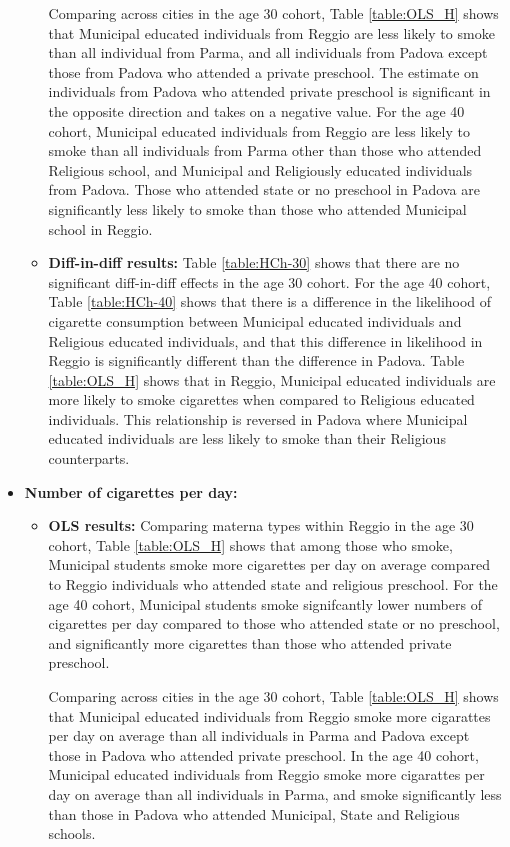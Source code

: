 \documentclass[11pt]{article}
\begin{document}
\begin{itemize}
\begin{itemize}
	Comparing across cities in the age 30 cohort, Table \ref{table:OLS_H} shows that Municipal educated individuals from Reggio are less likely to smoke than all individual from Parma, and all individuals from Padova except those from Padova who attended a private preschool. The estimate on individuals from Padova who attended private preschool is significant in the opposite direction and takes on a negative value. For the age 40 cohort, Municipal educated individuals from Reggio are less likely to smoke than all individuals from Parma other than those who attended Religious school, and Municipal and Religiously educated individuals from Padova. Those who attended state or no preschool in Padova are significantly less likely to smoke than those who attended Municipal school in Reggio.

	\item \textbf{Diff-in-diff results:} Table \ref{table:HCh-30} shows that there are no significant diff-in-diff effects in the age 30 cohort. For the age 40 cohort,  Table \ref{table:HCh-40} shows that there is a difference in the likelihood of cigarette consumption between Municipal educated individuals and Religious educated individuals, and that this difference in likelihood in Reggio is significantly different than the difference in Padova. Table \ref{table:OLS_H} shows that in Reggio, Municipal educated individuals are more likely to smoke cigarettes when compared to Religious educated individuals. This relationship is reversed in Padova where Municipal educated individuals are less likely to smoke than their Religious counterparts.
	\end{itemize}


\item \textbf{Number of cigarettes per day:} 
	
	\begin{itemize}
	\item \textbf{OLS results:} Comparing materna types within Reggio in the age 30 cohort, Table \ref{table:OLS_H} shows that among those who smoke, Municipal students smoke more cigarettes per day on average compared to Reggio individuals who attended state and religious preschool. For the age 40 cohort, Municipal students smoke signifcantly lower numbers of cigarettes per day compared to those who attended state or no preschool, and significantly more cigarettes than those who attended private preschool. 

	Comparing across cities in the age 30 cohort, Table \ref{table:OLS_H} shows that Municipal educated individuals from Reggio smoke more cigarattes per day on average than all individuals in Parma and Padova except those in Padova who attended private preschool. In the age 40 cohort, Municipal educated individuals from Reggio smoke more cigarattes per day on average than all individuals in Parma, and smoke significantly less than those in Padova who attended Municipal, State and Religious schools.
	

\end{itemize}
\end{itemize}
\end{document}
